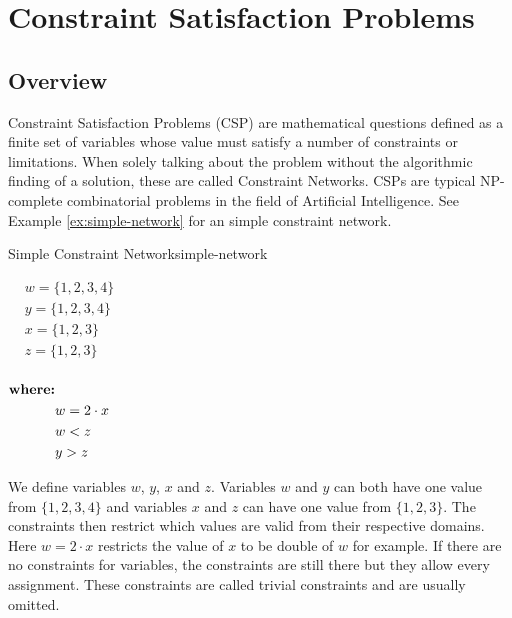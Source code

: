 \chapter{Constraint Satisfaction Problems} \label{chap:CSP}

\section{Overview}

Constraint Satisfaction Problems (CSP) \cite{csp:1987} are mathematical questions defined as a finite set of variables whose value must satisfy a number of constraints or limitations. When solely talking about the problem without the algorithmic finding of a solution, these are called Constraint Networks. CSPs are typical NP-complete combinatorial problems in the field of Artificial Intelligence. See Example \ref{ex:simple-network} for an simple constraint network. \\

\begin{example}{Simple Constraint Network}{simple-network}
	\begin{multicols}{2}
		$\begin{aligned}
				 & w = \{1, 2, 3, 4\} \\
				 & y = \{1, 2, 3, 4\} \\
				 & x = \{1, 2, 3\}    \\
				 & z = \{1, 2, 3\}    \\
			\end{aligned}$

		\columnbreak

		$\begin{aligned}
				\text{\textbf{where:}} &               \\
				                       & w = 2 \cdot x \\
				                       & w < z         \\
				                       & y > z         \\
			\end{aligned}$
	\end{multicols}
\end{example}

We define variables $w$, $y$, $x$ and $z$. Variables $w$ and $y$ can both have one value from $\{1, 2, 3, 4\}$ and variables $x$ and $z$ can have one value from $\{1, 2, 3\}$. The constraints then restrict which values are valid from their respective domains. Here $w = 2 \cdot x$ restricts the value of $x$ to be double of $w$ for example. If there are no constraints for variables, the constraints are still there but they allow every assignment. These constraints are called trivial constraints and are usually omitted.

